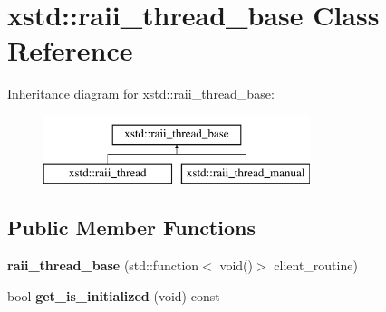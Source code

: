 \hypertarget{classxstd_1_1raii__thread__base}{\section{xstd\-:\-:raii\-\_\-thread\-\_\-base Class Reference}
\label{classxstd_1_1raii__thread__base}
}
Inheritance diagram for xstd\-:\-:raii\-\_\-thread\-\_\-base\-:\begin{figure}[H]
\begin{center}
\leavevmode
\includegraphics[height=2.000000cm]{classxstd_1_1raii__thread__base}
\end{center}
\end{figure}
\subsection*{Public Member Functions}
\begin{DoxyCompactItemize}
\item 
\hypertarget{classxstd_1_1raii__thread__base_a8f6cf744a47869c0e28a5e8a127c172b}{{\bfseries raii\-\_\-thread\-\_\-base} (std\-::function$<$ void()$>$ client\-\_\-routine)}\label{classxstd_1_1raii__thread__base_a8f6cf744a47869c0e28a5e8a127c172b}

\item 
\hypertarget{classxstd_1_1raii__thread__base_a9657cb2eddab6ef67b8884bff38ccbcb}{bool {\bfseries get\-\_\-is\-\_\-initialized} (void) const }\label{classxstd_1_1raii__thread__base_a9657cb2eddab6ef67b8884bff38ccbcb}

\end{DoxyCompactItemize}
